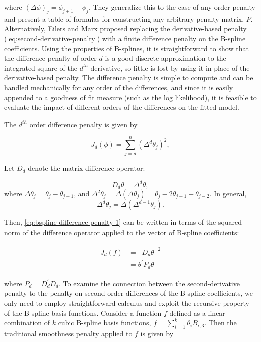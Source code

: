 \noindent
where $\left(\Delta \phi \right)_j = \phi_{j+1}-\phi_j$. They generalize this to the case of any order penalty and present a table of formulas for constructing any arbitrary penalty matrix, $P$.  Alternatively, Eilers and Marx proposed replacing the derivative-based penalty (\ref{eq:second-derivative-penalty}) with a finite difference penalty on the B-spline coefficients. Using the properties of B-splines, it is straightforward to show that the difference penalty of order $d$ is a good discrete approximation to the integrated square of the $d^{th}$ derivative, so little is lost by using it in place of the derivative-based penalty. The difference penalty is simple to compute and can be handled mechanically for any order of the differences, and since it is easily appended to a goodness of fit measure (such as the log likelihood), it is feasible to evaluate the impact of different orders of the differences on the fitted model.  

\bigskip

The $d^{th}$ order difference penalty is given by 

\begin{equation} \label{eq:bspline-difference-penalty-1}
J_d\left( \phi \right) = \sum_{j=d}^n \left(\Delta^d \theta_j\right)^2,
\end{equation} 

\noindent
Let $D_d$ denote the matrix difference operator:

\[
D_d\theta = \Delta^d \theta,
\]
\noindent
where $\Delta \theta_j = \theta_j - \theta_{j-1}$, and $\Delta^2 \theta_j = \Delta\left(\Delta \theta_j\right) = \theta_j - 2\theta_{j-1} + \theta_{j-2}$. In general,
\begin{equation*}
\Delta^d \theta_j = \Delta\left(\Delta^{d-1} \theta_j \right).
\end{equation*} 

\noindent
Then, \ref{eq:bspline-difference-penalty-1} can be written in terms of the squared norm of the difference operator applied to the vector of B-spline coefficients:

\begin{align} 
\begin{split} \label{eq:bspline-difference-penalty-2}
J_d\left( f \right) &= \vert \vert D_d\theta \vert \vert^2 \\
&= \theta^\prime P_d \theta
\end{split}
\end{align}

\noindent
where $P_d = D_d^\prime D_d$.  To examine the connection between the second-derivative penalty to the penalty on second-order differences of the B-spline coefficients, we only need to employ straightforward calculus and exploit the recursive property of the B-spline basis functions. Consider a function $f$ defined as a linear combination of $k$ cubic B-spline basis functions, $f = \sum_{i = 1}^k \theta_i B_{i,3}$. Then the traditional smoothness penalty applied to $f$ is given by

